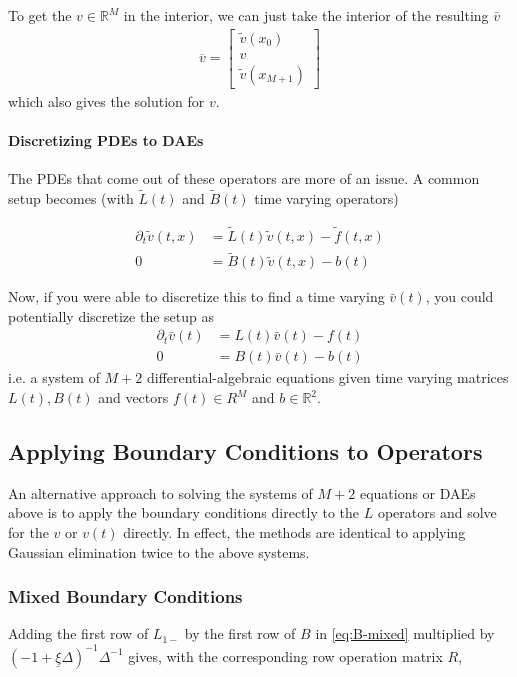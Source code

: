 \documentclass[11pt]{article}
\newcommand{\R}{\ensuremath{\mathbb{R}}}
\newcommand{\D}[1][]{\ensuremath{\partial_{#1}}}
\theoremstyle{definition}
\begin{document}
To get the $v\in \R^M$ in the interior, we can just take the interior of the resulting $\bar{v}$
\begin{align}
	\overline{v} = \begin{bmatrix}
	\tilde{v}(x_0) \\
	v \\
	\tilde{v}(x_{M+1})
	\end{bmatrix}
\end{align}
which also gives the solution for $v$.

\paragraph{Discretizing PDEs to DAEs}
The PDEs that come out of these operators are more of an issue.  A common setup becomes (with $\tilde{L}(t)$ and $\tilde{B}(t)$ time varying operators)

\begin{align}
	\D[t] \tilde{v}(t,x) &= \tilde{L}(t) \tilde{v}(t,x) - \tilde{f}(t,x)  \\
	0 &= \tilde{B}(t) \tilde{v}(t,x) - b(t)
\end{align}

Now, if you were able to discretize this to find a time varying $\bar{v}(t)$, you could potentially discretize the setup as
\begin{align}
	\D[t] \bar{v}(t) &= L(t) \bar{v}(t) - f(t)\\
	0 &= B(t) \bar{v}(t) - b(t)
\end{align}
i.e. a system of $M+2$ differential-algebraic equations given time varying matrices $L(t), B(t)$ and vectors $f(t) \in R^M$ and $b \in \R^2$.


\subsection{Applying Boundary Conditions to Operators}

An alternative approach to solving the systems of $M+2$ equations or DAEs above is to apply the boundary conditions directly to the $L$ operators and solve for the $v$ or $v(t)$ directly.  In effect, the methods are identical to applying Gaussian elimination twice to the above systems.

\subsubsection{Mixed Boundary Conditions}

Adding the first row of $L_{1-}$ by the first row of $B$ in \eqref{eq:B-mixed} multiplied by $(-1 + \underline{\xi} \Delta )^{-1}\Delta^{-1}$ gives, with the corresponding row operation matrix $R$,
\end{document}
